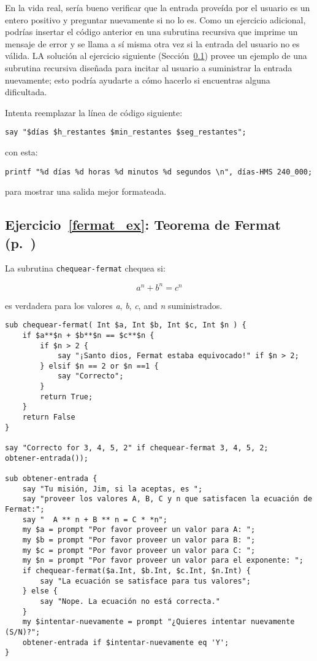 En la vida real, sería bueno verificar que la entrada proveída
por el usuario es un entero positivo y preguntar nuevamente
si no lo es. Como un ejercicio adicional, podrías insertar el
código anterior en una subrutina recursiva que imprime un mensaje
de error y se llama a sí misma otra vez si la entrada del usuario 
no es válida. LA solución al ejercicio siguiente 
(Sección~\ref{sol_fermat_ex}) provee un ejemplo de una subrutina
recursiva diseñada para incitar al usuario a suministrar la 
entrada nuevamente; esto podría ayudarte a cómo hacerlo si 
encuentras alguna dificultada. 

Intenta reemplazar la línea de código siguiente:
\begin{verbatim}
say "$días $h_restantes $min_restantes $seg_restantes"; 
\end{verbatim}
%
con esta:

\begin{verbatim}
printf "%d días %d horas %d minutos %d segundos \n", días-HMS 240_000;
\end{verbatim}
para mostrar una salida mejor formateada.

\subsection{Ejercicio~\ref{fermat_ex}: Teorema de Fermat (p.~\pageref{fermat_ex})}
\label{sol_fermat_ex}

La subrutina {\tt chequear-fermat} chequea si:

\[ a^n + b^n = c^n \]
%

es verdadera para los valores \emph{a}, \emph{b}, 
\emph{c}, and \emph{n} suministrados.

\begin{verbatim}
sub chequear-fermat( Int $a, Int $b, Int $c, Int $n ) {
    if $a**$n + $b**$n == $c**$n {
        if $n > 2 {
            say "¡Santo dios, Fermat estaba equivocado!" if $n > 2;
        } elsif $n == 2 or $n ==1 {
            say "Correcto";
        }
        return True; 
    }
    return False
}

say "Correcto for 3, 4, 5, 2" if chequear-fermat 3, 4, 5, 2;
obtener-entrada());

sub obtener-entrada {
    say "Tu misión, Jim, si la aceptas, es ";
    say "proveer los valores A, B, C y n que satisfacen la ecuación de Fermat:";
    say "  A ** n + B ** n = C * *n";
    my $a = prompt "Por favor proveer un valor para A: ";
    my $b = prompt "Por favor proveer un valor para B: ";
    my $c = prompt "Por favor proveer un valor para C: ";
    my $n = prompt "Por favor proveer un valor para el exponente: ";
    if chequear-fermat($a.Int, $b.Int, $c.Int, $n.Int) {
        say "La ecuación se satisface para tus valores";
    } else {
        say "Nope. La ecuación no está correcta."
    }
    my $intentar-nuevamente = prompt "¿Quieres intentar nuevamente (S/N)?";
    obtener-entrada if $intentar-nuevamente eq 'Y';
}
\end{verbatim}
%

